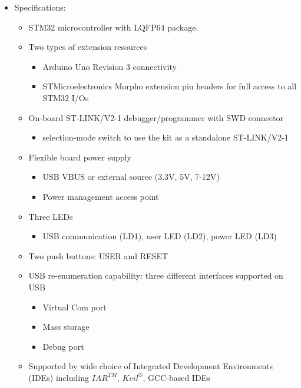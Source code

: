 \documentclass[D:/Latex/Internship/Report/Latex/Report.tex]{subfiles}
\begin{document}
			\begin{itemize}
				\item Specifications:
				\begin{itemize}
					\item STM32 microcontroller with LQFP64 package.
					\item Two types of extension resources
					\begin{itemize}
						\item Arduino Uno Revision 3 connectivity
						\item STMicroelectronics Morpho extension pin headers for full access to all STM32 I/Os
					\end{itemize}
					\item On-board ST-LINK/V2-1 debugger/programmer with SWD connector
					\begin{itemize}
						\item selection-mode switch to use the kit as a standalone ST-LINK/V2-1
					\end{itemize}
					\item Flexible board power supply
					\begin{itemize}
						\item USB VBUS or external source (3.3V, 5V, 7-12V)
						\item Power management access point
					\end{itemize}
					\item Three LEDs
					\begin{itemize}
						\item USB communication (LD1), user LED (LD2), power LED (LD3)
					\end{itemize}
					\item Two push buttons: USER and RESET
					\item USB re-enumeration capability: three different interfaces supported on USB
					\begin{itemize}
						\item Virtual Com port
						\item Mass storage
						\item Debug port
					\end{itemize}
					\item Supported by wide choice of Integrated Development Environments (IDEs) including $IAR^{TM}$, $Keil^{\circledR}$, GCC-based IDEs
				\end{itemize}
			\end{itemize}
\end{document}

